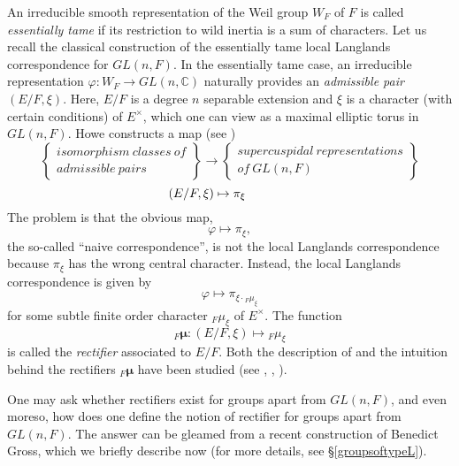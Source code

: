 \documentclass[11pt]{amsart}
\theoremstyle{plain}
\begin{document}
An irreducible smooth representation of the Weil group $W_F$ of $F$ is called \emph{essentially tame} if its restriction to wild inertia is a sum of characters.  Let us recall the classical construction of the essentially tame local Langlands correspondence for $GL(n,F)$.  In the essentially tame case, an irreducible representation $\varphi : W_F \rightarrow GL(n,\mathbb{C})$ naturally provides an \emph{admissible pair} $(E/F, \xi)$.  Here, $E/F$ is a degree $n$ separable extension and $\xi$ is a character (with certain conditions) of $E^{\times}$, which one can view as a maximal elliptic torus in $GL(n,F)$.  Howe constructs a map (see \cite{howe})
\begin{equation*}
\left\{
\begin{array}{ll}
isomorphism \ classes \ of \\
admissible \ pairs
\end{array}
\right\} \rightarrow \left\{
\begin{array}{ll}
supercuspidal \ representations \\
of \ GL(n,F)
\end{array} \right\}
\end{equation*}
$$\hspace{-.5in} (E/F, \xi) \mapsto \pi_{\xi}$$
The problem is that the obvious map, $$\varphi \mapsto \pi_{\xi},$$ the so-called ``naive correspondence'', is not the local Langlands correspondence because $\pi_{\xi}$ has the wrong central character.  Instead, the local Langlands correspondence is given by $$\varphi \mapsto \pi_{\xi \cdot {}_F \mu_{\xi}}$$ for some subtle finite order character ${}_F \mu_{\xi}$ of $E^{\times}$.  The function $${}_F \boldsymbol\mu : (E/F, \xi) \mapsto {}_F \mu_{\xi}$$ is called the \emph{rectifier} associated to $E/F$.  Both the description of and the intuition behind the rectifiers ${}_F \boldsymbol\mu$ have been studied (see \cite{bushnellhenniart}, \cite{geo}, \cite{adrian}).

One may ask whether rectifiers exist for groups apart from $GL(n,F)$, and even moreso, how does one define the notion of rectifier for groups apart from $GL(n,F)$.  The answer can be gleamed from a recent construction of Benedict Gross, which we briefly describe now (for more details, see \S\ref{groupsoftypeL}).
\end{document}
